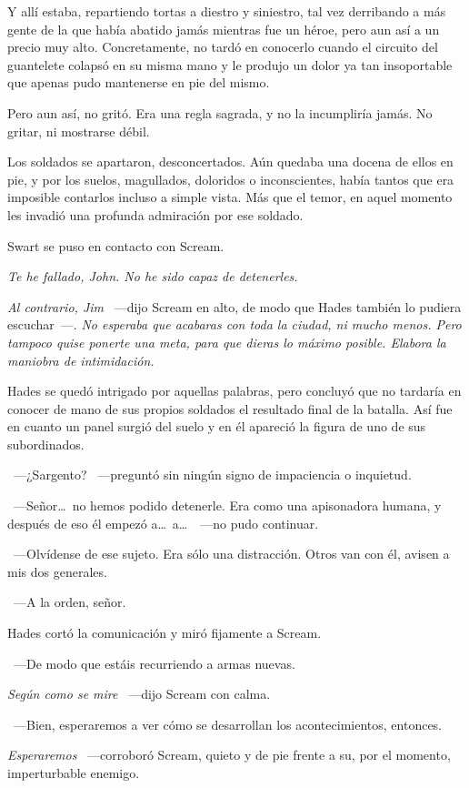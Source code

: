 Y allí estaba, repartiendo tortas a diestro y siniestro, tal vez derribando a más gente de la que había abatido jamás mientras fue un héroe, pero aun así a un precio muy alto. Concretamente, no tardó en conocerlo cuando el circuito del guantelete colapsó en su misma mano y le produjo un dolor ya tan insoportable que apenas pudo mantenerse en pie del mismo.

Pero aun así, no gritó. Era una regla sagrada, y no la incumpliría jamás. No gritar, ni mostrarse débil.

Los soldados se apartaron, desconcertados. Aún quedaba una docena de ellos en pie, y por los suelos, magullados, doloridos o inconscientes, había tantos que era imposible contarlos incluso a simple vista. Más que el temor, en aquel momento les invadió una profunda admiración por ese soldado.

Swart se puso en contacto con Scream.

\emph{Te he fallado, John. No he sido capaz de detenerles.}

\emph{Al contrario, Jim} ~---dijo Scream en alto, de modo que Hades también lo pudiera escuchar~---. \emph{No esperaba que acabaras con toda la ciudad, ni mucho menos. Pero tampoco quise ponerte una meta, para que dieras lo máximo posible. Elabora la maniobra de intimidación.}

Hades se quedó intrigado por aquellas palabras, pero concluyó que no tardaría en conocer de mano de sus propios soldados el resultado final de la batalla. Así fue en cuanto un panel surgió del suelo y en él apareció la figura de uno de sus subordinados.

~---¿Sargento? ~---preguntó sin ningún signo de impaciencia o inquietud.

~---Señor\dots\ no hemos podido detenerle. Era como una apisonadora humana, y después de eso él empezó a\dots\ a\dots\ ~---no pudo continuar.

~---Olvídense de ese sujeto. Era sólo una distracción. Otros van con él, avisen a mis dos generales.

~---A la orden, señor.

Hades cortó la comunicación y miró fijamente a Scream.

~---De modo que estáis recurriendo a armas nuevas.

\emph{Según como se mire} ~---dijo Scream con calma.

~---Bien, esperaremos a ver cómo se desarrollan los acontecimientos, entonces.

\emph{Esperaremos} ~---corroboró Scream, quieto y de pie frente a su, por el momento, imperturbable enemigo.

